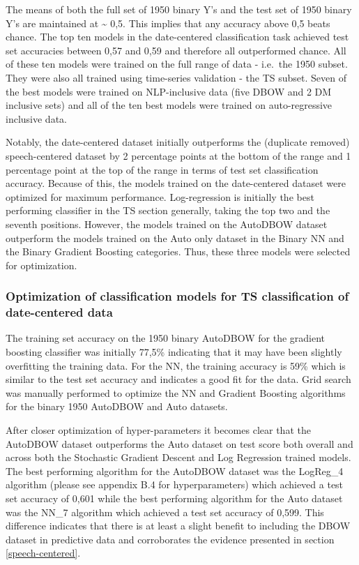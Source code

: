 \documentclass[11pt,preprint, authoryear]{elsarticle}
\numberwithin{equation}{section}
\numberwithin{figure}{section}
\numberwithin{table}{section}
\begin{document}
The means of both the full set of 1950 binary Y's and the test set of
1950 binary Y's are maintained at \textasciitilde{} 0,5. This implies
that any accuracy above 0,5 beats chance. The top ten models in the
date-centered classification task achieved test set accuracies between
0,57 and 0,59 and therefore all outperformed chance. All of these ten
models were trained on the full range of data - i.e.~the 1950 subset.
They were also all trained using time-series validation - the TS subset.
Seven of the best models were trained on NLP-inclusive data (five DBOW
and 2 DM inclusive sets) and all of the ten best models were trained on
auto-regressive inclusive data.

Notably, the date-centered dataset initially outperforms the (duplicate
removed) speech-centered dataset by 2 percentage points at the bottom of
the range and 1 percentage point at the top of the range in terms of
test set classification accuracy. Because of this, the models trained on
the date-centered dataset were optimized for maximum performance.
Log-regression is initially the best performing classifier in the TS
section generally, taking the top two and the seventh positions.
However, the models trained on the AutoDBOW dataset outperform the
models trained on the Auto only dataset in the Binary NN and the Binary
Gradient Boosting categories. Thus, these three models were selected for
optimization.

\hypertarget{optimization-of-classification-models-for-ts-classification-of-date-centered-data}{%
\subsubsection{Optimization of classification models for TS
classification of date-centered
data}\label{optimization-of-classification-models-for-ts-classification-of-date-centered-data}}

The training set accuracy on the 1950 binary AutoDBOW for the gradient
boosting classifier was initially 77,5\% indicating that it may have
been slightly overfitting the training data. For the NN, the training
accuracy is 59\% which is similar to the test set accuracy and indicates
a good fit for the data. Grid search was manually performed to optimize
the NN and Gradient Boosting algorithms for the binary 1950 AutoDBOW and
Auto datasets.

After closer optimization of hyper-parameters it becomes clear that the
AutoDBOW dataset outperforms the Auto dataset on test score both overall
and across both the Stochastic Gradient Descent and Log Regression
trained models. The best performing algorithm for the AutoDBOW dataset
was the LogReg\_4 algorithm (please see appendix B.4 for
hyperparameters) which achieved a test set accuracy of 0,601 while the
best performing algorithm for the Auto dataset was the NN\_7 algorithm
which achieved a test set accuracy of 0,599. This difference indicates
that there is at least a slight benefit to including the DBOW dataset in
predictive data and corroborates the evidence presented in section
\ref{speech-centered}.
\end{document}
